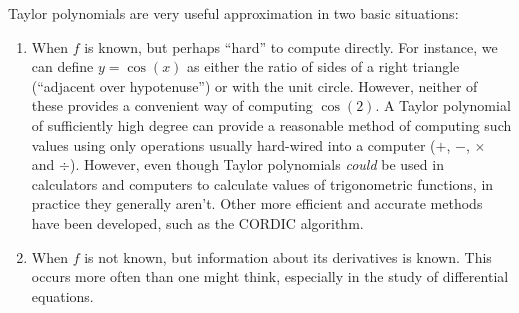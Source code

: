 \documentclass{ximera}
\begin{document}
Taylor polynomials are very useful approximation in two basic
situations:
\begin{enumerate}
\item When $f$ is known, but perhaps ``hard'' to compute directly. For
  instance, we can define $y=\cos(x)$ as either the ratio of sides of a
  right triangle (``adjacent over hypotenuse'') or with the unit
  circle. However, neither of these provides a convenient way of
  computing $\cos(2)$. A Taylor polynomial of sufficiently high degree
  can provide a reasonable method of computing such values using only
  operations usually hard-wired into a computer ($+$, $-$, $\times$
  and $\div$). However, even though Taylor polynomials \emph{could} be
  used in calculators and computers to calculate values of
  trigonometric functions, in practice they generally aren't. Other
  more efficient and accurate methods have been developed, such as the
  CORDIC algorithm.
\item When $f$ is not known, but information about its derivatives
  is known. This occurs more often than one might think, especially in
  the study of differential equations.
\end{enumerate}
\end{document}
